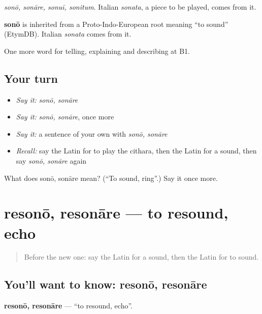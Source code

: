 \emph{sonō, sonāre, sonuī, sonitum}. Italian \emph{sonata}, a piece to be played, comes from it.

\begin{cousinweb}
\textbf{sonō} is inherited from a Proto-Indo-European root meaning \textquotedblleft{}to sound\textquotedblright{} (EtymDB). Italian \emph{sonata} comes from it.
\end{cousinweb}

\begin{grammarlens}[title={What you've built}]
One more word for telling, explaining and describing at B1.
\end{grammarlens}

\subsection*{Your turn}
\begin{itemize}
\raggedright
  \item \emph{Say it:} \emph{sonō, sonāre}
  \item \emph{Say it:} \emph{sonō, sonāre}, once more
  \item \emph{Say it:} a sentence of your own with \emph{sonō, sonāre}
  \item \emph{Recall:} say the Latin for to play the cithara, then the Latin for a sound, then say \emph{sonō, sonāre} again
\end{itemize}

\begin{tcolorbox}[breakable,colback=teal!4,colframe=teal!35!black,title={Before you move on}]
What does sonō, sonāre mean? (\textquotedblleft{}To sound, ring\textquotedblright{}.) Say it once more.
\end{tcolorbox}
\section[resonō, resonāre]{resonō, resonāre — to resound, echo}

\label{lesson:LA-C545-resono}



\begin{quote}
Before the new one: say the Latin for a sound, then the Latin for to sound.
\end{quote}

\subsection*{You'll want to know: resonō, resonāre}
\textbf{resonō, resonāre} — \textquotedblleft{}to resound, echo\textquotedblright{}.

